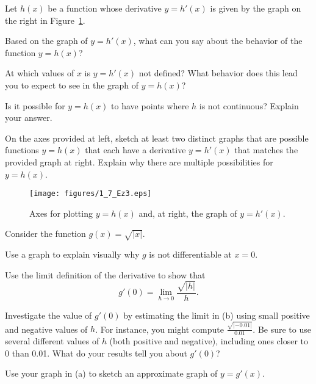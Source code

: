 \begin{exercises}
\item Let $h(x)$ be a function whose derivative $y= h'(x)$ is given by the graph on the right in Figure~\ref{F:1.7.Ez3}.
	\ba
		\item Based on the graph of $y = h'(x)$, what can you say about the behavior of the function $y = h(x)$?
		\item At which values of $x$ is $y = h'(x)$ not defined?  What behavior does this lead you to expect to see in the graph of $y=h(x)$?
		\item Is it possible for $y = h(x)$ to have points where $h$ is not continuous?  Explain your answer.
		\item On the axes provided at left, sketch at least two distinct graphs that are possible functions $y = h(x)$ that each have a derivative $y = h'(x)$ that matches the provided graph at right.  Explain why there are multiple possibilities for $y = h(x)$.
	\ea
\begin{figure}[h]
  \begin{center}
 \texttt{[image: figures/1\_7\_Ez3.eps]} %
   \end{center}
   \caption{Axes for plotting $y = h(x)$ and, at right, the graph of $y = h'(x)$.} \label{F:1.7.Ez3}
\end{figure}

\item Consider the function $g(x) = \sqrt{|x|}$.
	\ba
		\item Use a graph to explain visually why $g$ is not differentiable at $x = 0$.
		\item Use the limit definition of the derivative to show that
		$$g'(0) = \lim_{h \to 0} \frac{\sqrt{|h|}}{h}.$$
		\item Investigate the value of $g'(0)$ by estimating the limit in (b) using small positive and negative values of $h$.  For instance, you might compute $\frac{\sqrt{|-0.01|}}{0.01}$.  Be sure to use several different values of $h$ (both positive and negative), including ones closer to 0 than 0.01.  What do your results tell you about $g'(0)$?
		\item Use your graph in (a) to sketch an approximate graph of $y = g'(x)$.  
	\ea

\end{exercises}
\afterexercises